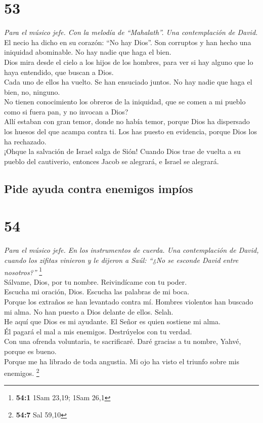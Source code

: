 \hypertarget{section-51}{%
\section{53}\label{section-51}}

\emph{Para el músico jefe. Con la melodía de ``Mahalath''. Una
contemplación de David.}\\
 El necio ha dicho en su corazón: ``No hay Dios''. Son
corruptos y han hecho una iniquidad abominable. No hay nadie que haga el
bien.\\
 Dios mira desde el cielo a los hijos de los hombres, para
ver si hay alguno que lo haya entendido, que buscan a Dios.\\
 Cada uno de ellos ha vuelto. Se han ensuciado juntos. No
hay nadie que haga el bien, no, ninguno.\\
 No tienen conocimiento los obreros de la iniquidad, que
se comen a mi pueblo como si fuera pan, y no invocan a Dios?\\
 Allí estaban con gran temor, donde no había temor, porque
Dios ha dispersado los huesos del que acampa contra ti. Los has puesto
en evidencia, porque Dios los ha rechazado.\\
 ¡Ohque la salvación de Israel salga de Sión! Cuando Dios
trae de vuelta a su pueblo del cautiverio, entonces Jacob se alegrará, e
Israel se alegrará.

\hypertarget{pide-ayuda-contra-enemigos-impuxedos}{%
\subsection{Pide ayuda contra enemigos
impíos}\label{pide-ayuda-contra-enemigos-impuxedos}}

\hypertarget{section-52}{%
\section{54}\label{section-52}}

\emph{Para el músico jefe. En los instrumentos de cuerda. Una
contemplación de David, cuando los zifitas vinieron y le dijeron a Saúl:
``¿No se esconde David entre nosotros?''} \footnote{\textbf{54:1} 1Sam
  23,19; 1Sam 26,1}\\
 Sálvame, Dios, por tu nombre. Reivindícame con tu
poder.\\
 Escucha mi oración, Dios. Escucha las palabras de mi
boca.\\
 Porque los extraños se han levantado contra mí. Hombres
violentos han buscado mi alma. No han puesto a Dios delante de ellos.
Selah.\\
 He aquí que Dios es mi ayudante. El Señor es quien
sostiene mi alma.\\
 Él pagará el mal a mis enemigos. Destrúyelos con tu
verdad.\\
 Con una ofrenda voluntaria, te sacrificaré. Daré gracias
a tu nombre, Yahvé, porque es bueno.\\
 Porque me ha librado de toda angustia. Mi ojo ha visto el
triunfo sobre mis enemigos. \footnote{\textbf{54:7} Sal 59,10}

